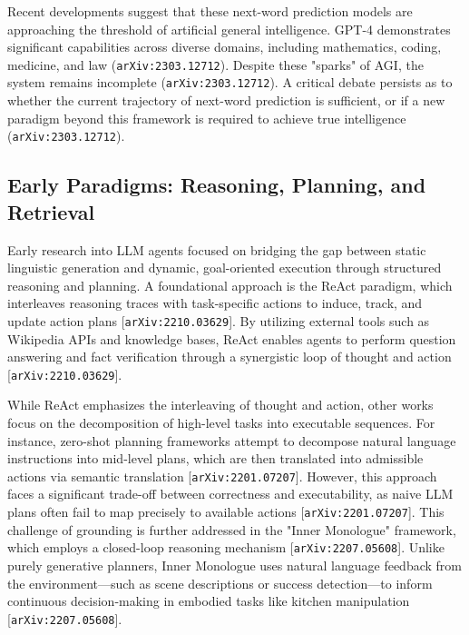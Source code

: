 \documentclass[11pt]{article}
\begin{document}
Recent developments suggest that these next-word prediction models are approaching the threshold of artificial general intelligence. GPT-4 demonstrates significant capabilities across diverse domains, including mathematics, coding, medicine, and law (\texttt{arXiv:2303.12712}). Despite these "sparks" of AGI, the system remains incomplete (\texttt{arXiv:2303.12712}). A critical debate persists as to whether the current trajectory of next-word prediction is sufficient, or if a new paradigm beyond this framework is required to achieve true intelligence (\texttt{arXiv:2303.12712}).

\subsection{Early Paradigms: Reasoning, Planning, and Retrieval}

Early research into LLM agents focused on bridging the gap between static linguistic generation and dynamic, goal-oriented execution through structured reasoning and planning. A foundational approach is the ReAct paradigm, which interleaves reasoning traces with task-specific actions to induce, track, and update action plans [\texttt{arXiv:2210.03629}]. By utilizing external tools such as Wikipedia APIs and knowledge bases, ReAct enables agents to perform question answering and fact verification through a synergistic loop of thought and action [\texttt{arXiv:2210.03629}].

While ReAct emphasizes the interleaving of thought and action, other works focus on the decomposition of high-level tasks into executable sequences. For instance, zero-shot planning frameworks attempt to decompose natural language instructions into mid-level plans, which are then translated into admissible actions via semantic translation [\texttt{arXiv:2201.07207}]. However, this approach faces a significant trade-off between correctness and executability, as naive LLM plans often fail to map precisely to available actions [\texttt{arXiv:2201.07207}]. This challenge of grounding is further addressed in the "Inner Monologue" framework, which employs a closed-loop reasoning mechanism [\texttt{arXiv:2207.05608}]. Unlike purely generative planners, Inner Monologue uses natural language feedback from the environment—such as scene descriptions or success detection—to inform continuous decision-making in embodied tasks like kitchen manipulation [\texttt{arXiv:2207.05608}].
\end{document}
